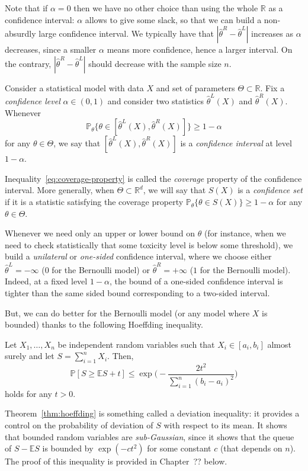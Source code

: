 \documentclass[
	fontsize=11pt, %
	twoside=false, %
	numbers=noenddot, %
]{kaobook}
\renewcommand{\P}{\mathbb P}
\newcommand{\E}{\mathbb E}
\newcommand{\R}{\mathbb R}
\newcommand{\wh}{\widehat}
\begin{document}
Note that if $\alpha = 0$ then we have no other choice than using the whole $\R$ as a confidence interval: $\alpha$ allows to give some slack, so that we can build a non-absurdly  large confidence interval. 
We typically have that $|\wh \theta^R - \wh \theta^L|$ increases as $\alpha$ decreases, since a smaller $\alpha$ means more confidence, hence a larger interval.
On the contrary, $|\wh \theta^R - \wh \theta^L|$ should decrease with the sample size $n$.
\begin{definition}
	Consider a statistical model with data $X$ and set of parameters $\Theta \subset \R$. 
	Fix a \emph{confidence level} $\alpha \in (0, 1)$ and consider two statistics $\wh \theta^L(X)$ and $\wh \theta^R(X)$. Whenever 
	\begin{equation}
		\label{eq:coverage-property}
		\P_\theta\{ \theta \in [\wh \theta^L(X), \wh \theta^R(X)] \} \geq 1 - \alpha
	\end{equation}
	for any $\theta \in \Theta$, we say that $[\wh \theta^L(X), \wh \theta^R(X)]$ is a \emph{confidence interval} at level $1 - \alpha$.
\end{definition}
Inequality~\eqref{eq:coverage-property} is called the \emph{coverage} property of the confidence interval.
More generally, when $\Theta \subset \R^d$, we will say that $S(X)$ is a \emph{confidence set} if it is a statistic satisfying the coverage property $\P_\theta\{ \theta \in S(X) \} \geq 1 - \alpha$ for any $\theta \in \Theta$.
\begin{remark}
	Whenever we need only an upper or lower bound on $\theta$ (for instance, when we need to check statistically that some toxicity level is below some threshold), we build a \emph{unilateral} or \emph{one-sided} confidence interval, where we choose either $\wh \theta^L = -\infty$ ($0$ for the Bernoulli model) or $\wh \theta^R = +\infty$ ($1$ for the Bernoulli model).
	Indeed, at a fixed level $1 - \alpha$, the bound of a one-sided confidence interval is tighter than the same sided bound corresponding to a two-sided interval. 
\end{remark}
But, we can do better for the Bernoulli model (or any model where $X$ is bounded) thanks to the following Hoeffding inequality.
\begin{theorem}
	\label{thm:hoeffding}
	Let $X_1, \ldots, X_n$ be independent random variables such that $X_i \in [a_i, b_i]$ almost surely and let $S = \sum_{i=1}^n X_i$. Then,
	\begin{equation*}
		\P[ S \geq \E S + t] \leq \exp\Big( - \frac{2 t^2}{\sum_{i=1}^n (b_i - a_i)^2} \Big)
	\end{equation*}
	holds for any $t >0$.
\end{theorem}
Theorem~\ref{thm:hoeffding} is something called a deviation inequality: it provides a control on the probability of deviation of $S$ with respect to its mean.
It shows that bounded random variables are \emph{sub-Gaussian}, since it shows that the queue of $S - \E S$ is bounded by $\exp(-c t^2)$ for some constant $c$ (that depends on $n$).
The proof of this inequality is provided in Chapter~?? below.
\end{document}
